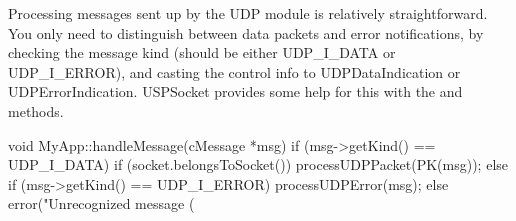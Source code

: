 
Processing messages sent up by the UDP module is relatively straightforward.
You only need to distinguish between data packets and error notifications,
by checking the message kind (should be either UDP\_I\_DATA or UDP\_I\_ERROR),
and casting the control info to UDPDataIndication or UDPErrorIndication.
USPSocket provides some help for this with the  and
 methods.

\begin{cpp}
void MyApp::handleMessage(cMessage *msg)
{
    if (msg->getKind() == UDP_I_DATA)
    {
        if (socket.belongsToSocket())
            processUDPPacket(PK(msg));
    }
    else if (msg->getKind() == UDP_I_ERROR)
    {
        processUDPError(msg);
    }
    else
    {
        error("Unrecognized message (%
    }
}
\end{cpp}

